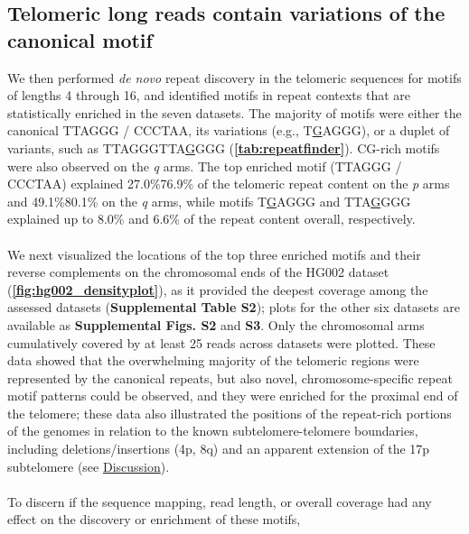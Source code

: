\documentclass{article}
\begin{document}
\subsection*{Telomeric long reads contain variations of the canonical motif}
    We then performed \textit{de novo} repeat discovery in the telomeric sequences for motifs of lengths 4 through 16,
            and identified motifs in repeat contexts that are statistically enriched in the seven datasets.
        The majority of motifs were either the canonical TTAGGG / CCCTAA,
            its variations (e.g., T\underline{G}AGGG),
            or a duplet of variants, such as TTAGGGTTA\underline{G}GGG
            (\textbf{\autoref{tab:repeatfinder}}).
        CG-rich motifs were also observed on the \textit{q} arms.
        The top enriched motif (TTAGGG / CCCTAA) explained
            27.0\%\textendash{}76.9\% of the telomeric repeat content on the \textit{p} arms
            and 49.1\%\textendash{}80.1\% on the \textit{q} arms,
            while motifs T\underline{G}AGGG and TTA\underline{G}GGG explained up to 8.0\% and 6.6\% of the repeat content overall, respectively.
    \\~\\
    We next visualized the locations of the top three enriched motifs and their reverse complements
        on the chromosomal ends of the HG002 dataset (\textbf{\autoref{fig:hg002_densityplot}}),
        as it provided the deepest coverage among the assessed datasets (\textbf{Supplemental Table S2});
            plots for the other six datasets are available as \textbf{Supplemental Figs. S2} and \textbf{S3}.
        Only the chromosomal arms cumulatively covered by at least 25 reads across datasets were plotted.
    These data showed that the overwhelming majority of the telomeric regions were represented by the canonical repeats,
        but also novel, chromosome-specific repeat motif patterns could be observed,
            and they were enriched for the proximal end of the telomere;
            these data also illustrated the positions of the repeat-rich portions of the genomes in relation to the
            known subtelomere-telomere boundaries, including deletions/insertions (4p, 8q)
            and an apparent extension of the 17p subtelomere (see \hyperref[sec:discussion]{Discussion}).
    \\~\\ %
    To discern if the sequence mapping, read length, or overall coverage had any effect on the discovery or enrichment of these motifs,
\end{document}
